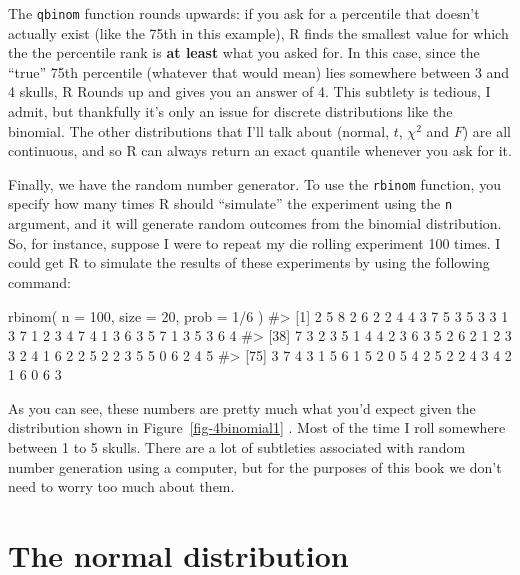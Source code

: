 \documentclass[
  letterpaper,
  DIV=11,
  numbers=noendperiod]{scrreprt}
\newenvironment{Shaded}{\begin{snugshade}}{\end{snugshade}}
\newcommand{\AttributeTok}[1]{\textcolor[rgb]{0.40,0.45,0.13}{#1}}
\newcommand{\CommentTok}[1]{\textcolor[rgb]{0.37,0.37,0.37}{#1}}
\newcommand{\DecValTok}[1]{\textcolor[rgb]{0.68,0.00,0.00}{#1}}
\newcommand{\FunctionTok}[1]{\textcolor[rgb]{0.28,0.35,0.67}{#1}}
\newcommand{\NormalTok}[1]{\textcolor[rgb]{0.00,0.23,0.31}{#1}}
\newcommand{\SpecialCharTok}[1]{\textcolor[rgb]{0.37,0.37,0.37}{#1}}
\begin{document}
The \texttt{qbinom} function rounds upwards: if you ask for a percentile
that doesn't actually exist (like the 75th in this example), R finds the
smallest value for which the the percentile rank is \textbf{at least}
what you asked for. In this case, since the ``true'' 75th percentile
(whatever that would mean) lies somewhere between 3 and 4 skulls, R
Rounds up and gives you an answer of 4. This subtlety is tedious, I
admit, but thankfully it's only an issue for discrete distributions like
the binomial. The other distributions that I'll talk about (normal,
\(t\), \(\chi^2\) and \(F\)) are all continuous, and so R can always
return an exact quantile whenever you ask for it.

Finally, we have the random number generator. To use the \texttt{rbinom}
function, you specify how many times R should ``simulate'' the
experiment using the \texttt{n} argument, and it will generate random
outcomes from the binomial distribution. So, for instance, suppose I
were to repeat my die rolling experiment 100 times. I could get R to
simulate the results of these experiments by using the following
command:

\begin{Shaded}
\begin{Highlighting}[]
\FunctionTok{rbinom}\NormalTok{( }\AttributeTok{n =} \DecValTok{100}\NormalTok{, }\AttributeTok{size =} \DecValTok{20}\NormalTok{, }\AttributeTok{prob =} \DecValTok{1}\SpecialCharTok{/}\DecValTok{6}\NormalTok{ )}
\CommentTok{\#\textgreater{}   [1] 2 5 8 2 6 2 2 4 4 3 7 5 3 5 3 3 1 3 7 1 2 3 4 7 4 1 3 6 3 5 7 1 3 5 3 6 4}
\CommentTok{\#\textgreater{}  [38] 7 3 2 3 5 1 4 4 2 3 6 3 5 2 6 2 1 2 3 3 2 4 1 6 2 2 5 2 2 3 5 5 0 6 2 4 5}
\CommentTok{\#\textgreater{}  [75] 3 7 4 3 1 5 6 1 5 2 0 5 4 2 5 2 2 4 3 4 2 1 6 0 6 3}
\end{Highlighting}
\end{Shaded}

As you can see, these numbers are pretty much what you'd expect given
the distribution shown in Figure~\ref{fig-4binomial1} . Most of the time
I roll somewhere between 1 to 5 skulls. There are a lot of subtleties
associated with random number generation using a computer, but for the
purposes of this book we don't need to worry too much about them.

\section{The normal distribution}\label{the-normal-distribution}
\end{document}
